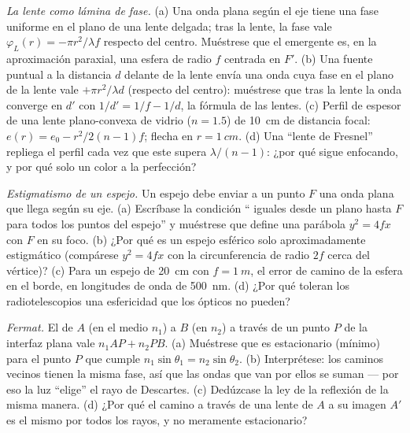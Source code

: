 \begin{exercise}[$\star\star$]\label{exo:b2:scalar-light-model:5}
\emph{La lente como lámina de fase.} (a) Una onda plana según el eje tiene una
fase uniforme en el plano de una lente delgada; tras la lente, la fase vale
$\varphi_L(r) = -\pi r^2/\lambda f$ respecto del centro. Muéstrese que el 
emergente es, en la aproximación paraxial, una esfera de radio $f$
centrada en $F'$. (b) Una fuente puntual a la distancia $d$ delante de la lente
envía una onda cuya fase en el plano de la lente vale $+\pi r^2/\lambda d$ (respecto
del centro): muéstrese que tras la lente la onda converge en $d'$ con
$1/d' = 1/f - 1/d$, la fórmula de las lentes. (c) Perfil de espesor de una
lente plano-convexa de vidrio ($n = 1.5$) de \qty{10}{cm} de distancia focal: $e(r) =
e_0 - r^2/2(n - 1)f$; flecha en $r = \qty{1}{cm}$. (d) Una ``lente de Fresnel'' repliega
el perfil cada vez que este supera $\lambda/(n - 1)$: ¿por qué sigue
enfocando, y por qué solo un color a la perfección?
\end{exercise}

\begin{exercise}[$\star\star$]\label{exo:b2:scalar-light-model:6}
\emph{Estigmatismo de un espejo.} Un espejo debe enviar a un punto $F$ una onda plana que llega
según su eje. (a) Escríbase la condición `` iguales
desde un  plano hasta $F$ para todos los puntos del espejo'' y
muéstrese que define una parábola $y^2 = 4fx$ con $F$ en su foco. (b) ¿Por qué es un
espejo esférico solo aproximadamente estigmático (compárese $y^2 = 4fx$ con
la circunferencia de radio $2f$ cerca del vértice)? (c) Para un espejo de \qty{20}{cm}
con $f = \qty{1}{m}$, el error de camino de la esfera en el borde, en
longitudes de onda de \qty{500}{nm}. (d) ¿Por qué toleran los radiotelescopios
una esfericidad que los ópticos no pueden?
\end{exercise}

\begin{exercise}[$\star\star$]\label{exo:b2:scalar-light-model:7}
\emph{Fermat.} El  de $A$ (en el medio $n_1$) a $B$ (en
$n_2$) a través de un punto $P$ de la interfaz plana vale $n_1AP + n_2PB$. (a)
Muéstrese que es estacionario (mínimo) para el punto $P$ que cumple
$n_1\sin\theta_1 = n_2\sin\theta_2$. (b) Interprétese: los caminos vecinos tienen la
misma fase, así que las ondas que van por ellos se suman --- por eso la luz
``elige'' el rayo de Descartes. (c) Dedúzcase la ley de la reflexión de la misma
manera. (d) ¿Por qué el camino a través de una lente de $A$ a su imagen $A'$ es el
mismo por todos los rayos, y no meramente estacionario?
\end{exercise}

